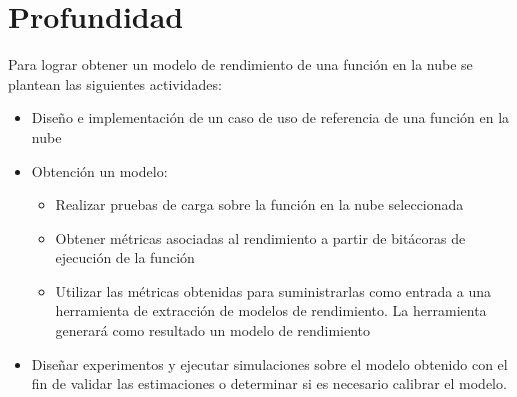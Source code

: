 \section{Profundidad}
Para lograr obtener un modelo de rendimiento de una función en la nube se plantean las siguientes actividades:
\begin{itemize}
    \item Diseño e implementación de un caso de uso de referencia de una función en la nube 
    \item Obtención un modelo:
    \begin{itemize}
        \item Realizar pruebas de carga sobre la función en la nube seleccionada
        \item Obtener métricas asociadas al rendimiento a partir de bitácoras de ejecución de la función
        \item Utilizar las métricas obtenidas para suministrarlas como entrada a una herramienta de extracción de modelos de rendimiento. La herramienta generará como resultado un modelo de rendimiento
    \end{itemize}
    \item Diseñar experimentos y ejecutar simulaciones sobre el modelo obtenido con el fin de validar las estimaciones o determinar si es necesario calibrar el modelo.
    
\end{itemize}




